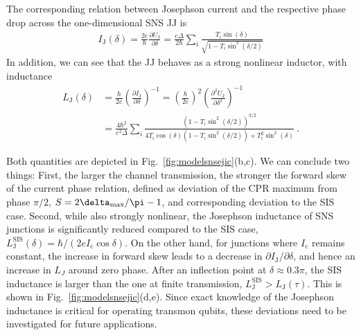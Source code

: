 The corresponding relation between Josephson current and the respective phase drop across the one-dimensional SNS JJ is 
\begin{align}
I_\text{J}(\delta) = \frac{2e}{\hbar}\frac{\partial U_\text{J}}{\partial\delta} = \frac{e\Delta}{2\hbar}\sum_i\frac{T_i\sin(\delta)}{\sqrt{1-T_i\sin^2(\delta/2)}}
\end{align}
%
In addition, we can see that the JJ behaves as a strong nonlinear inductor, with inductance
%
\begin{align}
L_\text{J}(\delta) &= \frac{\hbar}{2e}\left( \frac{\partial I_\text{J}}{\partial\delta} \right)^{-1} = \left(\frac{\hbar}{2e}\right)^2\left(\frac{\partial^2U_\text{J}}{\partial\delta^2}\right)^{-1} \nonumber\\
&= \frac{4\hbar^2}{e^2\Delta}\sum_i \frac{\left(1-T_i\sin^2(\delta/2)\right)^{3/2}}{4T_i\cos(\delta)\left(1-T_i\sin^2(\delta/2)\right)+T_i^2\sin^2(\delta)} \ .
\end{align} 


Both quantities are depicted in Fig.~\ref{fig:modelsnsejic}(b,c).
%
We can conclude two things:
%
First, the larger the channel transmission, the stronger the forward skew of the current phase relation, defined as deviation of the CPR maximum from phase $\pi/2$, $S=2\delta_{\rm max}/\pi -1$, and corresponding deviation to the SIS case.
%
Second, while also strongly nonlinear, the Josephson inductance of SNS junctions is significantly reduced compared to the SIS case, $L_\text{J}^\text{SIS}(\delta)=\hbar/(2eI_\text{c}\cos\delta)$.
%
On the other hand, for junctions where $I_\text{c}$ remains constant, the increase in forward skew leads to a decrease in $\partial I_\text{J}/\partial\delta$, and hence an increase in $L_J$ around zero phase.
%
After an inflection point at $\delta\approx0.3\pi$, the SIS inductance is larger than the one at finite transmission, $L_\text{J}^\text{SIS}>L_\text{J}(\tau)$.
%
This is shown in Fig.~\ref{fig:modelsnsejic}(d,e).
%
Since exact knowledge of the Josephson inductance is critical for operating transmon qubits, these deviations need to be investigated for future applications. 

